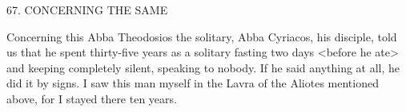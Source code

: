 67. CONCERNING THE SAME

Concerning this Abba Theodosios the solitary, Abba Cyriacos, his
disciple, told us that he spent thirty-five years as a solitary fasting
two days <before he ate> and keeping completely silent, speaking
to nobody. If he said anything at all, he did it by signs. I saw this
man myself in the Lavra of the Aliotes mentioned above, for I
stayed there ten years.
